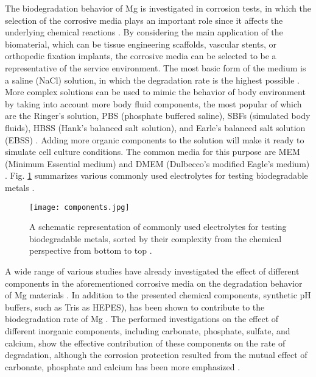 The biodegradation behavior of Mg is investigated in corrosion tests, in which the selection of the corrosive media plays an important role since it affects the underlying chemical reactions \cite{Mei2020}. By considering the main application of the biomaterial, which can be tissue engineering scaffolds, vascular stents, or orthopedic fixation implants, the corrosive media can be selected to be a representative of the service environment. The most basic form of the medium is a saline (NaCl) solution, in which the degradation rate is the highest possible \cite{Mei2020}. More complex solutions can be used to mimic the behavior of body environment by taking into account more body fluid components, the most popular of which are the Ringer's solution, PBS (phosphate buffered saline), SBFs (simulated body fluids), HBSS (Hank's balanced salt solution), and Earle's balanced salt solution (EBSS) \cite{Mei2020}. Adding more organic components to the solution will make it ready to simulate cell culture conditions. The common media for this purpose are MEM (Minimum Essential medium) and DMEM (Dulbecco's modified Eagle's medium) \cite{Mei2020}. Fig. \ref{fig:components} summarizes various commonly used electrolytes for testing biodegradable metals \cite{Mei2020}.


\begin{figure}
\centering
\medskip
\texttt{[image: components.jpg]}
\caption[Commonly used electrolytes for testing biodegradable metals]{A schematic representation of commonly used electrolytes for testing biodegradable metals, sorted by their complexity from the chemical perspective from bottom to top \cite{Mei2020}.} 
\label{fig:components}
\end{figure}

A wide range of various studies have already investigated the effect of different components in the aforementioned corrosive media on the degradation behavior of Mg materials \cite{Mei2019,Zeng2014,Johnston2017, Lamaka2018,Mei2019a}. In addition to the presented chemical components, synthetic pH buffers, such as Tris as HEPES), has been shown to contribute to the biodegradation rate of Mg \cite{Mei2019}. The performed investigations on the effect of different inorganic components, including carbonate, phosphate, sulfate, and calcium, show the effective contribution of these components on the rate of degradation, although the corrosion protection resulted from the mutual effect of carbonate, phosphate and calcium has been more emphasized \cite{Mei2019,Lamaka2018}.




